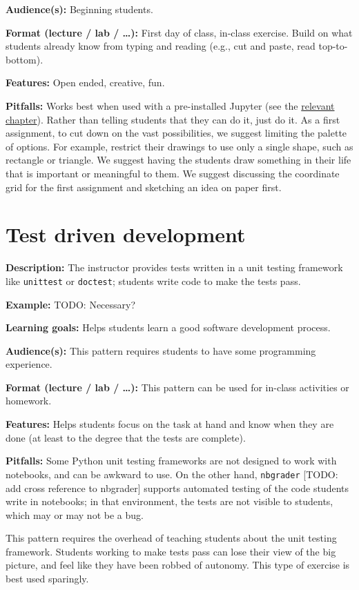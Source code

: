\documentclass[]{book}
\begin{document}
\textbf{Audience(s):} Beginning students.

\textbf{Format (lecture / lab / \ldots{}):} First day of class, in-class
exercise. Build on what students already know from typing and reading
(e.g., cut and paste, read top-to-bottom).

\textbf{Features:} Open ended, creative, fun.

\textbf{Pitfalls:} Works best when used with a pre-installed Jupyter
(see the \protect\hyperlink{jupyter}{relevant chapter}). Rather than
telling students that they can do it, just do it. As a first assignment,
to cut down on the vast possibilities, we suggest limiting the palette
of options. For example, restrict their drawings to use only a single
shape, such as rectangle or triangle. We suggest having the students
draw something in their life that is important or meaningful to them. We
suggest discussing the coordinate grid for the first assignment and
sketching an idea on paper first.

\section{Test driven development}\label{test-driven-development}

\textbf{Description:} The instructor provides tests written in a unit
testing framework like \texttt{unittest} or \texttt{doctest}; students
write code to make the tests pass.

\textbf{Example:} TODO: Necessary?

\textbf{Learning goals:} Helps students learn a good software
development process.

\textbf{Audience(s):} This pattern requires students to have some
programming experience.

\textbf{Format (lecture / lab / \ldots{}):} This pattern can be used for
in-class activities or homework.

\textbf{Features:} Helps students focus on the task at hand and know
when they are done (at least to the degree that the tests are complete).

\textbf{Pitfalls:} Some Python unit testing frameworks are not designed
to work with notebooks, and can be awkward to use. On the other hand,
\texttt{nbgrader} {[}TODO: add cross reference to nbgrader{]} supports
automated testing of the code students write in notebooks; in that
environment, the tests are not visible to students, which may or may not
be a bug.

This pattern requires the overhead of teaching students about the unit
testing framework. Students working to make tests pass can lose their
view of the big picture, and feel like they have been robbed of
autonomy. This type of exercise is best used sparingly.
\end{document}
